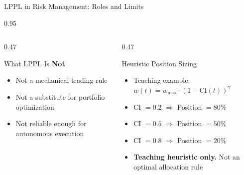 \documentclass[9pt, aspectratio=169, t]{beamer}
\begin{document}
\begin{frame}{LPPL in Risk Management: Roles and Limits}
\begin{cminipage}{0.95\textwidth}
{\begin{columns}[T]
\begin{column}{0.47\textwidth}
            \begin{alertblock}{What LPPL Is \textbf{Not}}
                \begin{itemize}\setlength{\itemsep}{0pt}
                    \item Not a mechanical trading rule
                    \item Not a substitute for portfolio optimization
                    \item Not reliable enough for autonomous execution
                \end{itemize}
            \end{alertblock}
        \end{column}
        \begin{column}{0.47\textwidth}
            \begin{block}{Heuristic Position Sizing}
                \begin{itemize}\setlength{\itemsep}{0pt}
                    \item Teaching example: $w(t) = w_{\max} \cdot (1 - \text{CI}(t))^\gamma$
                    \item CI $= 0.2$ $\Rightarrow$ Position $= 80\%$
                    \item CI $= 0.5$ $\Rightarrow$ Position $= 50\%$
                    \item CI $= 0.8$ $\Rightarrow$ Position $= 20\%$
                    \item \textbf{Teaching heuristic only.} Not an optimal allocation rule
                \end{itemize}
            \end{block}
        \end{column}
    \end{columns}
    }
    \end{cminipage}
\end{frame}
\end{document}

